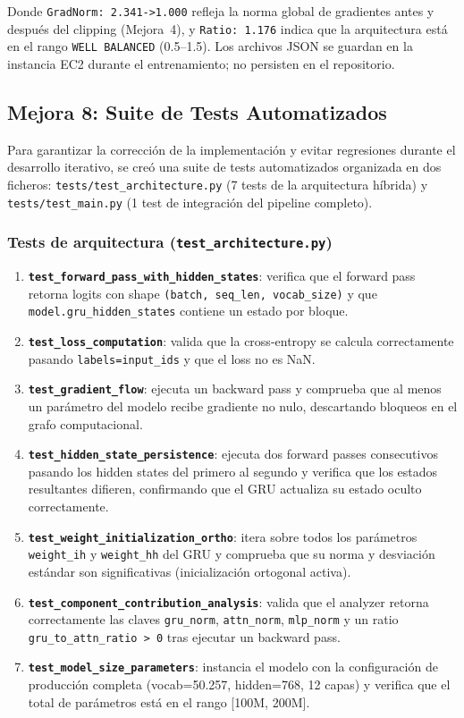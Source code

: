 Donde \texttt{GradNorm: 2.341->1.000} refleja la norma global de gradientes antes y después del clipping (Mejora~4), y \texttt{Ratio: 1.176} indica que la arquitectura está en el rango \texttt{WELL BALANCED} (0.5–1.5). Los archivos JSON se guardan en la instancia EC2 durante el entrenamiento; no persisten en el repositorio.

\subsection{Mejora 8: Suite de Tests Automatizados}

Para garantizar la corrección de la implementación y evitar regresiones durante el desarrollo iterativo, se creó una suite de tests automatizados organizada en dos ficheros: \texttt{tests/test\_architecture.py} (7 tests de la arquitectura híbrida) y \texttt{tests/test\_main.py} (1 test de integración del pipeline completo).

\subsubsection*{Tests de arquitectura (\texttt{test\_architecture.py})}

\begin{enumerate}
    \item \textbf{\texttt{test\_forward\_pass\_with\_hidden\_states}}: verifica que el forward pass retorna logits con shape \texttt{(batch, seq\_len, vocab\_size)} y que \texttt{model.gru\_hidden\_states} contiene un estado por bloque.
    \item \textbf{\texttt{test\_loss\_computation}}: valida que la cross-entropy se calcula correctamente pasando \texttt{labels=input\_ids} y que el loss no es NaN.
    \item \textbf{\texttt{test\_gradient\_flow}}: ejecuta un backward pass y comprueba que al menos un parámetro del modelo recibe gradiente no nulo, descartando bloqueos en el grafo computacional.
    \item \textbf{\texttt{test\_hidden\_state\_persistence}}: ejecuta dos forward passes consecutivos pasando los hidden states del primero al segundo y verifica que los estados resultantes difieren, confirmando que el GRU actualiza su estado oculto correctamente.
    \item \textbf{\texttt{test\_weight\_initialization\_ortho}}: itera sobre todos los parámetros \texttt{weight\_ih} y \texttt{weight\_hh} del GRU y comprueba que su norma y desviación estándar son significativas (inicialización ortogonal activa).
    \item \textbf{\texttt{test\_component\_contribution\_analysis}}: valida que el analyzer retorna correctamente las claves \texttt{gru\_norm}, \texttt{attn\_norm}, \texttt{mlp\_norm} y un ratio \texttt{gru\_to\_attn\_ratio > 0} tras ejecutar un backward pass.
    \item \textbf{\texttt{test\_model\_size\_parameters}}: instancia el modelo con la configuración de producción completa (vocab=50.257, hidden=768, 12 capas) y verifica que el total de parámetros está en el rango [100M, 200M].
\end{enumerate}

